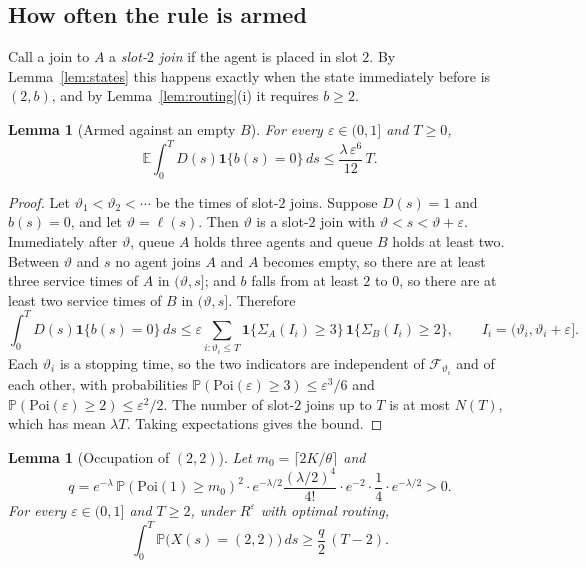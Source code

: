 \documentclass[11pt]{article}
\newtheorem{blem}[bthm]{Lemma}
\theoremstyle{definition}
\theoremstyle{remark}
\newcommand{\E}{\mathbb{E}}
\renewcommand{\Pr}{\mathbb{P}}
\newcommand{\ind}{\mathbf{1}}
\newcommand{\cF}{\mathcal{F}}
\newcommand{\Reps}{R^{\varepsilon}}
\newcommand{\SvA}{\Sigma_A}
\newcommand{\SvB}{\Sigma_B}
\newcommand{\Poi}{\mathrm{Poi}}
\begin{document}
\subsection{How often the rule is armed}

Call a join to $A$ a \emph{slot-$2$ join} if the agent is placed in slot $2$.
By Lemma~\ref{lem:states} this happens exactly when the state immediately
before is $(2,b)$, and by Lemma~\ref{lem:routing}(i) it requires $b\ge2$.

\begin{blem}[Armed against an empty $B$]\label{lem:bad}
For every $\varepsilon\in(0,1]$ and $T\ge0$,
\[
  \E\int_0^T D(s)\ind\{b(s)=0\}\,ds\le\frac{\lambda\,\varepsilon^{6}}{12}\,T .
\]
\end{blem}

\begin{proof}
Let $\vartheta_1<\vartheta_2<\cdots$ be the times of slot-$2$ joins. Suppose
$D(s)=1$ and $b(s)=0$, and let $\vartheta=\ell(s)$. Then $\vartheta$ is a
slot-$2$ join with $\vartheta<s<\vartheta+\varepsilon$. Immediately after
$\vartheta$, queue $A$ holds three agents and queue $B$ holds at least two.
Between $\vartheta$ and $s$ no agent joins $A$ and $A$ becomes empty, so there
are at least three service times of $A$ in $(\vartheta,s]$; and $b$ falls from
at least $2$ to $0$, so there are at least two service times of $B$ in
$(\vartheta,s]$. Therefore
\[
  \int_0^T D(s)\ind\{b(s)=0\}\,ds\le\varepsilon\sum_{i:\vartheta_i\le T}
  \ind\{\SvA(I_i)\ge3\}\,\ind\{\SvB(I_i)\ge2\},
  \qquad I_i=(\vartheta_i,\vartheta_i+\varepsilon].
\]
Each $\vartheta_i$ is a stopping time, so the two indicators are independent
of $\cF_{\vartheta_i}$ and of each other, with probabilities
$\Pr(\Poi(\varepsilon)\ge3)\le\varepsilon^3/6$ and
$\Pr(\Poi(\varepsilon)\ge2)\le\varepsilon^2/2$. The number of slot-$2$ joins up
to $T$ is at most $N(T)$, which has mean $\lambda T$. Taking expectations
gives the bound.
\end{proof}

\begin{blem}[Occupation of $(2,2)$]\label{lem:occupation}
Let $m_0=\lceil2K/\theta\rceil$ and
\[
  q=e^{-\lambda}\,\Pr(\Poi(1)\ge m_0)^2\cdot
  e^{-\lambda/2}\frac{(\lambda/2)^4}{4!}\cdot e^{-2}\cdot\frac14\cdot
  e^{-\lambda/2}>0 .
\]
For every $\varepsilon\in(0,1]$ and $T\ge2$, under $\Reps$ with optimal routing,
\[
  \int_0^T\Pr\bigl(X(s)=(2,2)\bigr)\,ds\ge\frac{q}{2}\,(T-2).
\]
\end{blem}
\end{document}
